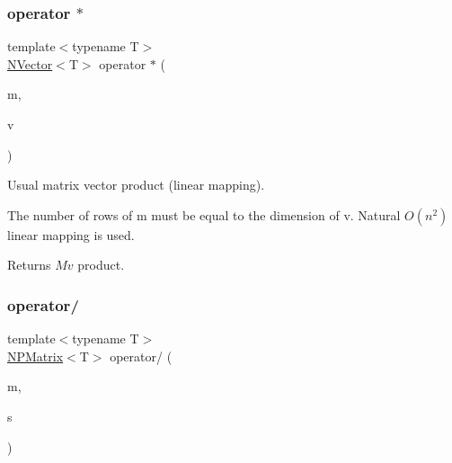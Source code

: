 \subsubsection{\texorpdfstring{operator $\ast$}{operator *}\hspace{0.1cm}{\footnotesize\ttfamily [4/4]}}
{\footnotesize\ttfamily template$<$typename T$>$ \\
\mbox{\hyperlink{class_n_vector}{N\+Vector}}$<$T$>$ operator $\ast$ (\begin{DoxyParamCaption}\item[{const \mbox{\hyperlink{class_n_p_matrix}{N\+P\+Matrix}}$<$ T $>$ \&}]{m,  }\item[{\mbox{\hyperlink{class_n_vector}{N\+Vector}}$<$ T $>$}]{v }\end{DoxyParamCaption})\hspace{0.3cm}{\ttfamily [friend]}}



Usual matrix vector product (linear mapping). 

The number of rows of m must be equal to the dimension of v. Natural $ O(n^2) $ linear mapping is used. \begin{DoxyReturn}{Returns}
$ M v $ product. 
\end{DoxyReturn}
\mbox{\label{class_n_p_matrix_ae976e53eca81caea13a8e077ced70d68}} 
\subsubsection{\texorpdfstring{operator/}{operator/}\hspace{0.1cm}{\footnotesize\ttfamily [1/2]}}
{\footnotesize\ttfamily template$<$typename T$>$ \\
\mbox{\hyperlink{class_n_p_matrix}{N\+P\+Matrix}}$<$T$>$ operator/ (\begin{DoxyParamCaption}\item[{\mbox{\hyperlink{class_n_p_matrix}{N\+P\+Matrix}}$<$ T $>$}]{m,  }\item[{T}]{s }\end{DoxyParamCaption})\hspace{0.3cm}{\ttfamily [friend]}}

\mbox{\label{class_n_p_matrix_aaad3ba825a660b8019218ed6088c2cb7}} 

